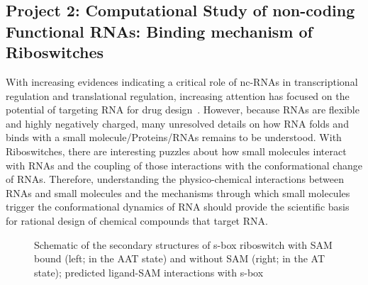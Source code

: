 \documentclass[a4paper,10pt]{article}
\begin{document}
\subsection*{Project 2: Computational Study of non-coding Functional RNAs: Binding mechanism of Riboswitches}


With increasing evidences indicating a critical role of nc-RNAs in transcriptional regulation and
translational regulation, increasing attention has focused on the potential of targeting RNA for drug
design~\cite{foloppe}.
However, because 
RNAs are flexible and highly negatively charged, many unresolved details on how RNA folds and binds with a small molecule/Proteins/RNAs remains to be understood.  With Riboswitches, there are interesting puzzles about how small molecules 
interact with RNAs and the coupling of those interactions with the conformational change of RNAs. 
Therefore, understanding the physico-chemical interactions between RNAs and small molecules and
the mechanisms through which small molecules trigger the conformational dynamics of RNA should 
provide the scientific basis for rational design of chemical compounds that target RNA.

\begin{figure}
   \hspace{0.05in}
\caption{Schematic of the secondary structures of s-box riboswitch with SAM bound (left; in the AAT state) and without SAM 
(right; in the AT state); predicted ligand-SAM interactions with s-box}
\end{figure}
\end{document}
